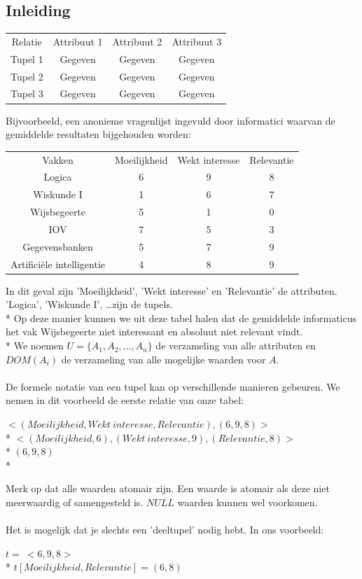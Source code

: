 \documentclass[10pt]{article}
\begin{document}
\subsection{Inleiding}
\begin{center}
\begin{tabular}{ c c c c }
  Relatie & Attribuut 1 & Attribuut 2 & Attribuut 3\\
  Tupel 1 & Gegeven & Gegeven & Gegeven\\
  Tupel 2 & Gegeven & Gegeven & Gegeven\\
  Tupel 3 & Gegeven & Gegeven & Gegeven\\
\end{tabular}
\end{center}
Bijvoorbeeld, een anonieme vragenlijst ingevuld door informatici waarvan de gemiddelde resultaten bijgehouden worden:
\begin{center}
\begin{tabular}{ c c c c }
  Vakken & Moeilijkheid & Wekt interesse & Relevantie\\
  Logica & 6 & 9 & 8\\
  Wiskunde I & 1 & 6 & 7\\
  Wijsbegeerte & 5 & 1 & 0\\
  IOV & 7 & 5 & 3\\
  Gegevensbanken & 5 & 7 & 9\\
  Artifici\"ele intelligentie & 4 & 8 & 9\\
\end{tabular}
\end{center}
In dit geval zijn 'Moeilijkheid', 'Wekt interesse' en 'Relevantie' de attributen. 'Logica', 'Wiskunde I', \dots zijn de tupels.\\*
Op deze manier kunnen we uit deze tabel halen dat de gemiddelde informaticus het vak Wijsbegeerte niet interessant en absoluut niet relevant vindt.\\*
We noemen $U = \{A_1, A_2, \dots, A_n\}$ de verzameling van alle attributen en $DOM(A_i)$ de verzameling van alle mogelijke waarden voor $A$.\\\\
De formele notatie van een tupel kan op verschillende manieren gebeuren. We nemen in dit voorbeeld de eerste relatie van onze tabel:
\begin{center}
$<(Moeilijkheid, Wekt\ interesse, Relevantie), (6, 9, 8)>$\\*
$<(Moeilijkheid, 6), (Wekt\ interesse, 9), (Relevantie, 8)>$\\*
$(6, 9, 8)$\\*
\end{center}
Merk op dat alle waarden atomair zijn. Een waarde is atomair als deze niet meerwaardig of samengesteld is. $NULL$ waarden kunnen wel voorkomen.\\\\
Het is mogelijk dat je slechts een 'deeltupel' nodig hebt. In ons voorbeeld:
\begin{center}
$t =\ <6, 9, 8>$\\*
$t[Moeilijkheid, Relevantie] = (6, 8)$
\end{center}
\end{document}
